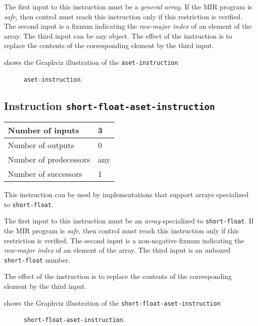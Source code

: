 The first input to this instruction must be a \emph{general array}.
If the MIR program is \emph{safe}, then control must reach this
instruction only if this restriction is verified.  The second input is
a fixnum indicating the \emph{row-major index} of an element of the
array.  The third input can be any object.  The effect of the
instruction is to replace the contents of the corresponding element by
the third input.

 shows the Graphviz illustration of the
\texttt{aset-instruction}

\begin{figure}
\begin{center}
\end{center}
\caption{\label{fig-aset-instruction}
\texttt{aset-instruction}.}
\end{figure}

\subsection{Instruction \texttt{short-float-aset-instruction}}
\label{mir-instruction-short-float-aset}

\begin{tabular}{|l|l|}
\hline
Number of inputs & 3\\
\hline
Number of outputs & 0\\
\hline
Number of predecessors & any\\
\hline
Number of successors & 1\\
\hline
\end{tabular}

This instruction can be used by implementations that support arrays
specialized to \texttt{short-float}.

The first input to this instruction must be an \emph{array}
specialized to \texttt{short-float}.  If the MIR program is
\emph{safe}, then control must reach this instruction only if this
restriction is verified.  The second input is a non-negative fixnum
indicating the \emph{row-major index} of an element of the array.  
The third input is an unboxed \texttt{short-float} number.

The effect of the instruction is to replace the contents of the
corresponding element by the third input.

 shows the Graphviz illustration of the
\texttt{short-float-aset-instruction}

\begin{figure}
\begin{center}
\end{center}
\caption{\label{fig-short-float-aset-instruction}
\texttt{short-float-aset-instruction}.}
\end{figure}

